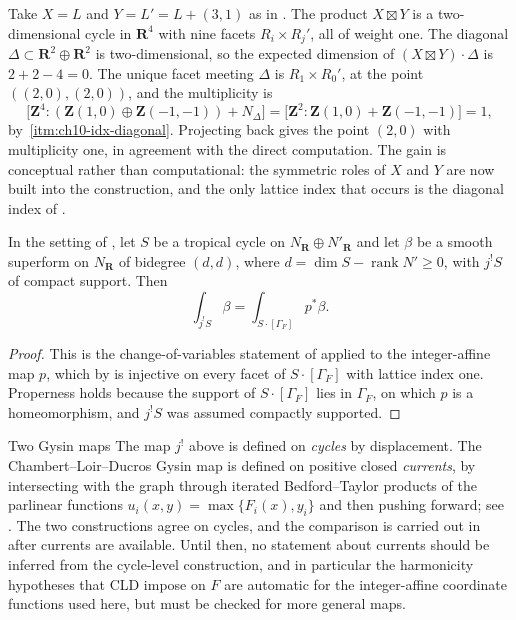 \begin{example}
\label{ex:ch10-lines-via-diagonal}
Take $X=L$ and $Y=L'=L+(3,1)$ as in
.  The product $X\boxtimes Y$ is a
two-dimensional cycle in $\mathbf R^4$ with nine facets
$R_i\times R_j'$, all of weight one.  The diagonal
$\Delta\subset\mathbf R^2\oplus\mathbf R^2$ is two-dimensional, so the
expected dimension of $(X\boxtimes Y)\cdot\Delta$ is $2+2-4=0$.  The unique
facet meeting $\Delta$ is $R_1\times R_0'$, at the point
$((2,0),(2,0))$, and the multiplicity is
\[
 \bigl[\mathbf Z^4:(\mathbf Z(1,0)\oplus\mathbf Z(-1,-1))+N_\Delta\bigr]
 =\bigl[\mathbf Z^2:\mathbf Z(1,0)+\mathbf Z(-1,-1)\bigr]=1,
\]
by \,\cref{itm:ch10-idx-diagonal}.  Projecting back gives
the point $(2,0)$ with multiplicity one, in agreement with the direct
computation.  The gain is conceptual rather than computational: the
symmetric roles of $X$ and $Y$ are now built into the construction, and the
only lattice index that occurs is the diagonal index of
.
\end{example}

\begin{proposition}
\label{prop:ch10-gysin-projection}
In the setting of , let $S$ be a tropical cycle on
$N_{\mathbf R}\oplus N'_{\mathbf R}$ and let $\beta$ be a smooth superform on
$N_{\mathbf R}$ of bidegree $(d,d)$, where
$d=\dim S-\operatorname{rank}N'\geq0$, with $j^!S$ of compact support.
Then
\[
 \int_{j^!S}\beta
 =\int_{S\cdot[\Gamma_F]}p^*\beta .
\]
\end{proposition}

\begin{proof}
This is the change-of-variables statement of
 applied to the integer-affine map $p$,
which by  is injective on every facet of
$S\cdot[\Gamma_F]$ with lattice index one.  Properness holds because the
support of $S\cdot[\Gamma_F]$ lies in $\Gamma_F$, on which $p$ is a
homeomorphism, and $j^!S$ was assumed compactly supported.
\end{proof}

\begin{warning}{Two Gysin maps}
The map $j^!$ above is defined on \emph{cycles} by displacement.  The
Chambert--Loir--Ducros Gysin map is defined on positive closed
\emph{currents}, by intersecting with the graph through iterated
Bedford--Taylor products of the parlinear functions
$u_i(x,y)=\max\{F_i(x),y_i\}$ and then pushing forward; see
\cite[\S9.5]{CLD25}.  The two constructions agree on cycles, and the
comparison is carried out in  after currents are
available.  Until then, no statement about currents should be inferred from
the cycle-level construction, and in particular the harmonicity hypotheses
that CLD impose on $F$ are automatic for the integer-affine coordinate
functions used here, but must be checked for more general maps.
\end{warning}


